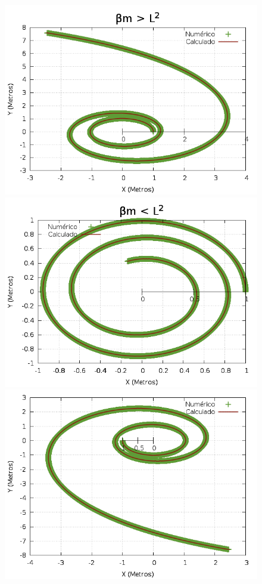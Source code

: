 \documentclass[a4paper,12pt]{exam}
\begin{document}
		\begin{figure}[l]
			\centering
			\includegraphics[scale=0.3]{3o0.png}
			\includegraphics[scale=0.3]{3o1.png}
			\includegraphics[scale=0.3]{3o2.png}

\end{figure}
\end{document}
